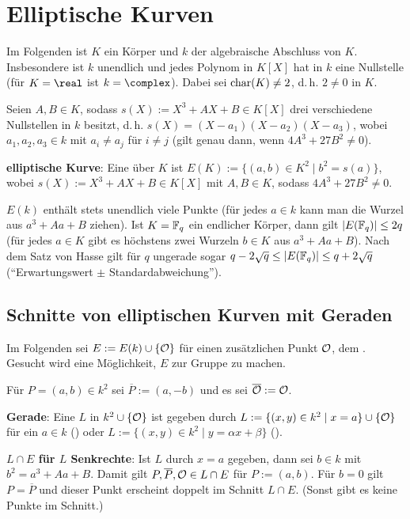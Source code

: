 \section{%
    Elliptische Kurven%
}

Im Folgenden ist $K$ ein Körper und $k$ der algebraische Abschluss von $K$.
Insbesondere ist $k$ unendlich und jedes Polynom in $K[X]$ hat in $k$ eine Nullstelle
(für $K = \real$ ist $k = \complex$).
Dabei sei $\operatorname{char}(K) \not= 2$, d.\,h. $2 \not= 0$ in $K$.

Seien $A, B \in K$, sodass $s(X) := X^3 + AX + B \in K[X]$ drei verschiedene Nullstellen in $k$
besitzt, d.\,h. $s(X) = (X - a_1)(X - a_2)(X - a_3)$, wobei $a_1, a_2, a_3 \in k$
mit $a_i \not= a_j$ für $i \not= j$ (gilt genau dann, wenn $4A^3 + 27B^2 \not= 0$).

\textbf{elliptische Kurve}:
Eine  über $K$ ist
$E(K) := \{(a, b) \in K^2 \;|\; b^2 = s(a)\}$,
wobei $s(X) := X^3 + AX + B \in K[X]$ mit $A, B \in K$, sodass $4A^3 + 27B^2 \not= 0$.

$E(k)$ enthält stets unendlich viele Punkte
(für jedes $a \in k$ kann man die Wurzel aus $a^3 + Aa + B$ ziehen).
Ist $K = \mathbb{F}_q$ ein endlicher Körper, dann gilt $|E(\mathbb{F}_q)| \le 2q$
(für jedes $a \in K$ gibt es höchstens zwei Wurzeln $b \in K$ aus $a^3 + Aa + B$).
Nach dem Satz von Hasse gilt für $q$ ungerade sogar
$q - 2\sqrt{q} \le |E(\mathbb{F}_q)| \le q + 2\sqrt{q}$
("`Erwartungswert $\pm$ Standardabweichung"').

\subsection{%
    Schnitte von elliptischen Kurven mit Geraden%
}

Im Folgenden sei $E := E(k) \cup \{\mathcal{O}\}$ für einen zusätzlichen Punkt $\mathcal{O}$,
dem .
Gesucht wird eine Möglichkeit, $E$ zur Gruppe zu machen.

Für $P = (a, b) \in k^2$ sei $\overline{P} := (a, -b)$ und es sei $\overline{\mathcal{O}} := \mathcal{O}$.

\textbf{Gerade}:
Eine  $L$ in $k^2 \cup \{\mathcal{O}\}$ ist gegeben durch
$L := \{(x, y) \in k^2 \;|\; x = a\} \cup \{\mathcal{O}\}$ für ein $a \in k$ () oder
$L := \{(x, y) \in k^2 \;|\; y = \alpha x + \beta\}$ ().

\linie

\textbf{$L \cap E$ für $L$ Senkrechte}:
Ist $L$ durch $x = a$ gegeben, dann sei $b \in k$ mit $b^2 = a^3 + Aa + B$.
Damit gilt $P, \overline{P}, \mathcal{O} \in L \cap E$ für $P := (a, b)$.
Für $b = 0$ gilt $P = \overline{P}$ und dieser Punkt erscheint doppelt im Schnitt $L \cap E$.
(Sonst gibt es keine Punkte im Schnitt.)

